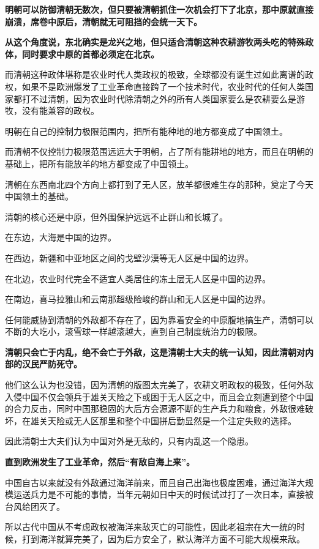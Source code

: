 \documentclass[UTF8, 11pt, oneside]{ctexart}
\newcommand{\zd}[1]{\textbf{\textcolor[RGB]{123,12,0}{#1}}} %
\begin{document}
\zd{明朝可以防御清朝无数次，但只要被清朝抓住一次机会打下了北京，那中原就直接崩溃，席卷中原后，清朝就无可阻挡的会统一天下。}

\zd{从这个角度说，东北确实是龙兴之地，但只适合清朝这种农耕游牧两头吃的特殊政体，同时要求中原的首都必须定在北京。}

而清朝这种政体堪称是农业时代人类政权的极致，全球都没有诞生过如此离谱的政权，如果不是欧洲爆发了工业革命直接跨了一个技术时代，农业时代的任何人类国家都打不过清朝，因为农业时代除清朝之外的所有人类国家要么是农耕要么是游牧，没有能兼容的政权。

明朝在自己的控制力极限范围内，把所有能种地的地方都变成了中国领土。

而清朝不仅控制力极限范围远远大于明朝，占了所有能耕地的地方，而且在明朝的基础上，把所有能放羊的地方都变成了中国领土。

清朝在东西南北四个方向上都打到了无人区，放羊都很难生存的那种，奠定了今天中国领土的基础。

清朝的核心还是中原，但外围保护远远不止群山和长城了。

在东边，大海是中国的边界。

在西边，新疆和中亚地区之间的戈壁沙漠等无人区是中国的边界。

在北边，农业时代完全不适宜人类居住的冻土层无人区是中国的边界。

在南边，喜马拉雅山和云南那超级险峻的群山和无人区是中国的边界。

任何能威胁到清朝的外敌都不存在了，因为靠着安全的中原腹地搞生产，清朝可以不断的大吃小，滚雪球一样越滚越大，直到自己制度统治力的极限。

\zd{清朝只会亡于内乱，绝不会亡于外敌，这是清朝士大夫的统一认知，因此清朝对内部的汉民严防死守。}

他们这么认为也没错，因为清朝的版图太完美了，农耕文明政权的极致，任何外敌入侵中国不仅会顿兵于雄关天险之下或困于无人区之中，而且会立刻遭到整个中国的合力反击，同时中国那稳固的大后方会源源不断的生产兵力和粮食，外敌很难破坏，在雄关天险或无人区那里和整个中国拼后勤显然是一个注定失败的选择。

因此清朝士大夫们认为中国对外是无敌的，只有内乱这一个隐患。

\zd{直到欧洲发生了工业革命，然后“有敌自海上来”。}

中国自古以来就没有外敌通过海洋前来，而且自己出海也极度困难，通过海洋大规模运送兵力是不可能的事情，当年元朝如日中天的时候试过打了一次日本，直接被台风给团灭了。

所以古代中国从不考虑政权被海洋来敌灭亡的可能性，因此老祖宗在大一统的时候，打到海洋就算完美了，因为后方安全了，默认海洋方面不可能大规模来敌。
\end{document}
